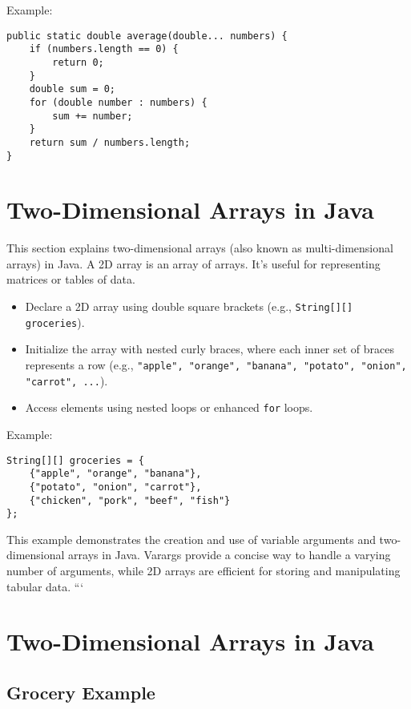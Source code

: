\documentclass{article}
\begin{document}
Example:

\begin{verbatim}
public static double average(double... numbers) {
    if (numbers.length == 0) {
        return 0;
    }
    double sum = 0;
    for (double number : numbers) {
        sum += number;
    }
    return sum / numbers.length;
}
\end{verbatim}

\section{Two-Dimensional Arrays in Java}

This section explains two-dimensional arrays (also known as multi-dimensional arrays) in Java.  A 2D array is an array of arrays.  It's useful for representing matrices or tables of data.

\begin{itemize}
    \item Declare a 2D array using double square brackets (e.g., \texttt{String[][] groceries}).
    \item Initialize the array with nested curly braces, where each inner set of braces represents a row (e.g., \texttt{{"apple", "orange", "banana"}, {"potato", "onion", "carrot"}, ...}).
    \item Access elements using nested loops or enhanced \texttt{for} loops.
\end{itemize}

Example:

\begin{verbatim}
String[][] groceries = {
    {"apple", "orange", "banana"},
    {"potato", "onion", "carrot"},
    {"chicken", "pork", "beef", "fish"}
};
\end{verbatim}

This example demonstrates the creation and use of variable arguments and two-dimensional arrays in Java.  Varargs provide a concise way to handle a varying number of arguments, while 2D arrays are efficient for storing and manipulating tabular data.
```


\section{Two-Dimensional Arrays in Java}

\subsection{Grocery Example}
\end{document}

